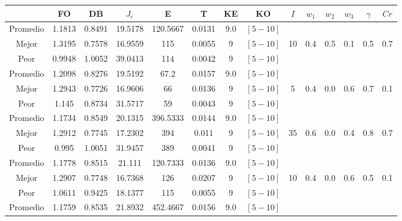 \begin{table}[h!]
    \footnotesize
    \begin{center}
        \begin{tabular}{|c|c|c|c|c|c|c|c|c|c|c|c|c|c|}
        \hline
            & {\bf FO} & {\bf DB} & $J_e$ & {\bf E} & {\bf T} & {\bf KE} & {\bf KO} & $I$ & $w_1$ & $w_2$ & $w_3$ & $\gamma$ & $Cr$ \\
        \hline
        \hline
            Promedio  & 1.1813 & 0.8491 & 19.5178 & 120.5667 & 0.0131 & 9.0 & $[5-10]$ &  &  &  &  &  & \\
            \cline{1-8}
            Mejor & 1.3195 & 0.7578  & 16.9559 & 115 & 0.0055 & 9 & $[5-10]$ & 10 & 0.4 & 0.5 & 0.1 & 0.5 & 0.7\\
            \cline{1-8}
            Peor & 0.9948 & 1.0052  & 39.0413 & 114 & 0.0042 & 9 & $[5-10]$ &  &  &  &  &  & \\
        \hline
        \hline
            Promedio  & 1.2098 & 0.8276 & 19.5192 & 67.2 & 0.0157 & 9.0 & $[5-10]$ &  &  &  &  &  & \\
            \cline{1-8}
            Mejor & 1.2943 & 0.7726  & 16.9606 & 66 & 0.0136 & 9 & $[5-10]$ & 5 & 0.4 & 0.0 & 0.6 & 0.7 & 0.1\\
            \cline{1-8}
            Peor & 1.145 & 0.8734  & 31.5717 & 59 & 0.0043 & 9 & $[5-10]$ &  &  &  &  &  & \\
        \hline
        \hline
            Promedio  & 1.1734 & 0.8549 & 20.1315 & 396.5333 & 0.0144 & 9.0 & $[5-10]$ &  &  &  &  &  & \\
            \cline{1-8}
            Mejor & 1.2912 & 0.7745  & 17.2302 & 394 & 0.011 & 9 & $[5-10]$ & 35 & 0.6 & 0.0 & 0.4 & 0.8 & 0.7\\
            \cline{1-8}
            Peor & 0.995 & 1.0051  & 31.9457 & 389 & 0.0041 & 9 & $[5-10]$ &  &  &  &  &  & \\
        \hline
        \hline
            Promedio  & 1.1778 & 0.8515 & 21.111 & 120.7333 & 0.0136 & 9.0 & $[5-10]$ &  &  &  &  &  & \\
            \cline{1-8}
            Mejor & 1.2907 & 0.7748  & 16.7368 & 126 & 0.0207 & 9 & $[5-10]$ & 10 & 0.4 & 0.0 & 0.6 & 0.5 & 0.1\\
            \cline{1-8}
            Peor & 1.0611 & 0.9425  & 18.1377 & 115 & 0.0055 & 9 & $[5-10]$ &  &  &  &  &  & \\
        \hline
        \hline
            Promedio  & 1.1759 & 0.8535 & 21.8932 & 452.4667 & 0.0156 & 9.0 & $[5-10]$ &  &  &  &  &  & \\

\end{tabular}
\end{center}
\end{table}
